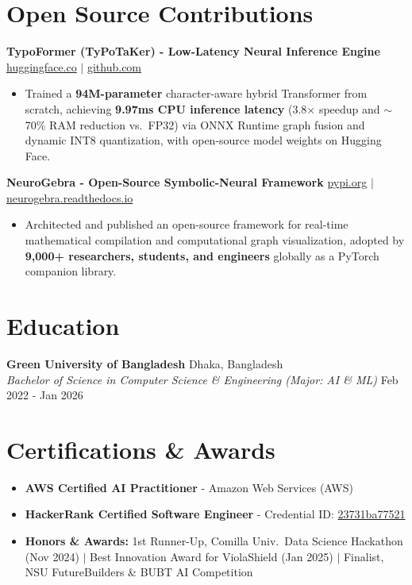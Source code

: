 \documentclass[9.5pt,a4paper]{article}
\begin{document}
\section*{Open Source Contributions}
\noindent
\textbf{TypoFormer (TyPoTaKer) - Low-Latency Neural Inference Engine} \hfill \href{https://huggingface.co/fahiiim/TypoFormer}{huggingface.co} $\vert$ \href{https://github.com/fahiiim/TyPoTaKer}{github.com}
\begin{itemize}
    \item Trained a \textbf{94M-parameter} character-aware hybrid Transformer from scratch, achieving \textbf{9.97ms CPU inference latency} (3.8$\times$ speedup and $\sim$70\% RAM reduction vs.\ FP32) via ONNX Runtime graph fusion and dynamic INT8 quantization, with open-source model weights on Hugging Face.
\end{itemize}
\vspace{0.6pt}
\noindent
\textbf{NeuroGebra - Open-Source Symbolic-Neural Framework} \hfill \href{https://pypi.org/project/neurogebra/}{pypi.org} $\vert$ \href{https://neurogebra.readthedocs.io}{neurogebra.readthedocs.io}
\begin{itemize}
    \item Architected and published an open-source framework for real-time mathematical compilation and computational graph visualization, adopted by \textbf{9,000+ researchers, students, and engineers} globally as a PyTorch companion library.
\end{itemize}
\vspace{0.6pt}

\section*{Education}
\noindent
\textbf{Green University of Bangladesh} \hfill Dhaka, Bangladesh\\
\textit{Bachelor of Science in Computer Science \& Engineering (Major: AI \& ML)} \hfill Feb 2022 - Jan 2026

\section*{Certifications \& Awards}
\begin{itemize}
    \item \textbf{AWS Certified AI Practitioner} - Amazon Web Services (AWS)
    \item \textbf{HackerRank Certified Software Engineer} - Credential ID: \href{https://www.hackerrank.com/certificates/23731ba77521}{23731ba77521}
    \item \textbf{Honors \& Awards:} 1st Runner-Up, Comilla Univ.\ Data Science Hackathon (Nov 2024) $\vert$ Best Innovation Award for ViolaShield (Jan 2025) $\vert$ Finalist, NSU FutureBuilders \& BUBT AI Competition
\end{itemize}
\end{document}
